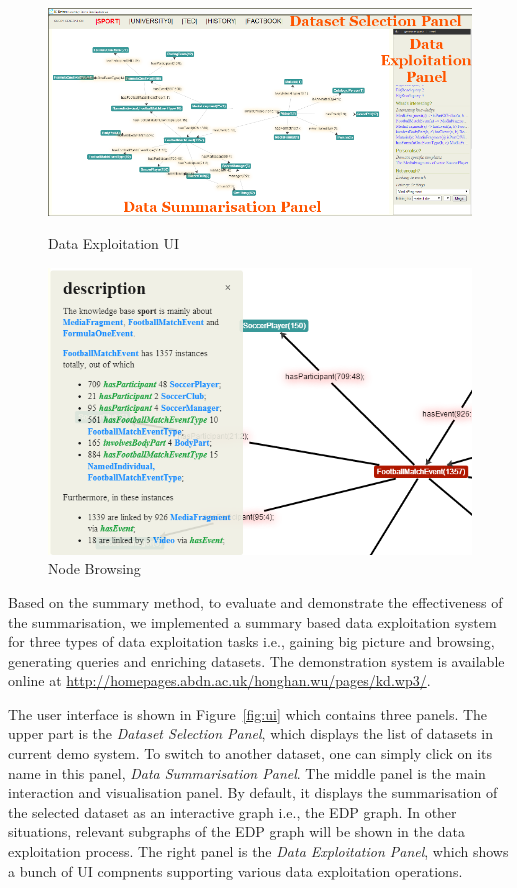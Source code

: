 
\begin{figure}
  \includegraphics[scale=0.30, trim=12mm 1mm 5cm 1cm]{figures/ui_general_annotated.png}
 \caption{Data Exploitation UI}\label{fig:ui}
\endminipage\hfill
{}
  \includegraphics[scale=0.30]{figures/node.png}
  \caption{Node Browsing}\label{fig:node}
\endminipage
\end{figure}
\vspace{-2mm}
Based on the summary method, to evaluate and demonstrate the effectiveness of the summarisation, we implemented a summary based data exploitation system for three types of data exploitation tasks i.e., gaining big picture and browsing, generating queries and enriching datasets. The demonstration system is available online at \url{http://homepages.abdn.ac.uk/honghan.wu/pages/kd.wp3/}.

The user interface is shown in Figure~\ref{fig:ui} which contains three panels. The upper part is the \emph{Dataset Selection Panel}, which displays the list of datasets in current demo system. To switch to another dataset, one can simply click on its name in this panel, \emph{Data Summarisation Panel}. The middle panel is the main interaction and visualisation panel. By default, it displays the summarisation of the selected dataset as an interactive graph i.e., the EDP graph. In other situations, relevant subgraphs of the EDP graph will be shown in the data exploitation process. The right panel is the \emph{Data Exploitation Panel}, which shows a bunch of UI compnents supporting various data exploitation operations.

